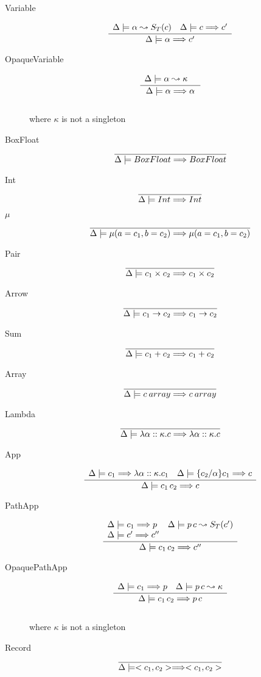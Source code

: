 \documentclass[12pt,twoside,fleqn]{amsart}
\theoremstyle{plain}
\theoremstyle{plain}
\theoremstyle{definition}
\begin{document}
\begin{description}
\item [Variable]
\[
\frac{\begin{array}{ll}
\Delta  \models \alpha   \leadsto S_{T}(c )  & \Delta  \models c \Longrightarrow c'
\end{array} }{\Delta  \models \alpha  \Longrightarrow c' }\]

\item [OpaqueVariable]
\[
\frac{\begin{array}{ll}
\Delta  \models \alpha   \leadsto \kappa   & 
\end{array} }{\Delta  \models \alpha  \Longrightarrow \alpha  }\]
\\
where \( \kappa  \) is not a singleton
\item [BoxFloat]
\[
\overline{\Delta  \models BoxFloat \Longrightarrow BoxFloat }\]

\item [Int]
\[
\overline{\Delta  \models Int \Longrightarrow Int }\]

\item [\( \mu  \)]
\[
\overline{\Delta  \models \mu (a=c_{1},b=c_{2})  \Longrightarrow \mu (a=c_{1},b=c_{2})  }\]
 
\item [Pair]
\[
\overline{\Delta  \models c_{1}\times c_{2}  \Longrightarrow c_{1}\times c_{2}  }\]

\item [Arrow]
\[
\overline{\Delta  \models c_{1}\rightarrow c_{2}  \Longrightarrow c_{1}\rightarrow c_{2}  }\]

\item [Sum]
\[
\overline{\Delta  \models c_{1}+c_{2}  \Longrightarrow c_{1}+c_{2}  }\]

\item [Array]
\[
\overline{\Delta  \models c \: array \Longrightarrow c \: array }\]

\item [Lambda]
\[
\overline{\Delta  \models \lambda \alpha  ::\kappa  .c  \Longrightarrow \lambda \alpha  ::\kappa  .c  }\]

\item [App]
\[
\frac{\begin{array}{ll}
\Delta  \models c_{1}  \Longrightarrow \lambda \alpha ::\kappa .c_{1}  & \Delta  \models \{c_{2} /\alpha  \}c_{1} \Longrightarrow c
\end{array} }{\Delta  \models c_{1}\, c_{2}  \Longrightarrow c  }\]
 
\item [PathApp]
\[
\frac{\begin{array}{ll}
\Delta  \models c_{1}  \Longrightarrow p  & \Delta  \models p\, c  \leadsto S_{T}(c' ) \\
\Delta  \models c' \Longrightarrow c'' & 
\end{array} }{\Delta  \models c_{1}\, c_{2}  \Longrightarrow c''  }\]

\item [OpaquePathApp]
\[
\frac{\begin{array}{ll}
\Delta  \models c_{1}  \Longrightarrow p  & \Delta  \models p\, c  \leadsto \kappa  
\end{array} }{\Delta  \models c_{1}\, c_{2}  \Longrightarrow p\, c  }\]
\\
where \( \kappa  \) is not a singleton
\item [Record]
\[
\overline{\Delta  \models <c_{1},c_{2}>  \Longrightarrow <c_{1},c_{2}>  }\]


\end{description}
\end{document}
